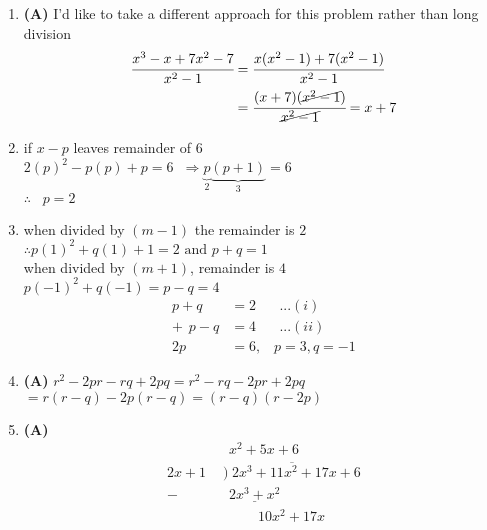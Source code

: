 \begin{multicols}{2}
\begin{enumerate}[label={\textbf{\arabic*.}}]
    \item \textbf{(A)} I'd like to take a different approach for this problem rather than long division \\
    \begin{align*} 
        \cfrac{x^3 - x  + 7x^2 - 7}{x^2 - 1} & = \cfrac{x(x^2 -1) + 7(x^2 -1)}{x^2 - 1}  \\
        & = \cfrac{(x+7)(\cancel{x^2 - 1})}{\cancel{x^2 -1}} = x+7
    \end{align*}
    \item if $x-p$ leaves remainder of 6  \\
    $2(p)^2 -p(p) + p = 6 \hspace{7pt} \Rightarrow  \underbrace{p}_{2} \underbrace{(p+1)}_{3} = 6$ \\
    $\therefore \hspace{10pt} p = 2$
    \item when divided by $(m-1)$ the remainder is $2$ \\
    $\therefore p(1)^2 + q(1) + 1 = 2 \text{ and } p + q = 1$\\
    when divided by $(m+1)$, remainder is $4$ \\
    $p(-1)^2 + q(-1) = p -q = 4$
    \begin{align*} 
        p + q &= 2 \hspace{20pt} ...(i) \\
       +\hspace{5pt}  p - q &= 4 \hspace{20pt} ...(ii) \\
       2p & = 6, \hspace{10pt} p = 3, q = -1
    \end{align*}
\item \textbf{(A)} 
    \(r^2 - 2pr - rq + 2pq = r^2 - rq - 2pr + 2pq \)\\
    \(= r(r - q) - 2p(r - q) = (r - q)(r - 2p)\)    
\item \textbf{(A)} 
        \begin{align*}
            & \hspace{5pt} x^2 + 5x + 6 \\
            2x + 1 \hspace{5pt} & \overline{) \hspace{3pt} 2x^3 + 11x^2 + 17x + 6} \\
            - & \hspace{5pt} \underline{2x^3 + x^2} \\
            & \hspace{30pt} 10x^2 + 17x \\

\end{align*}
\end{enumerate}
\end{multicols}
